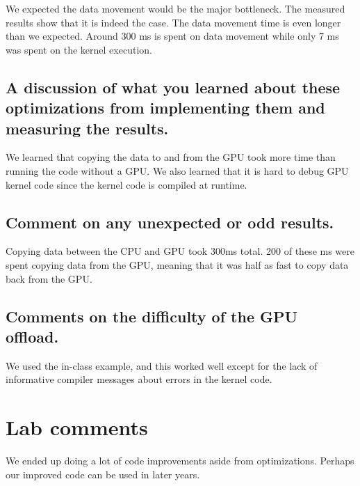\documentclass{article}
\begin{document}
We expected the data movement would be the major bottleneck. The
measured results show that it is indeed the case. The data movement
time is even longer than we expected. Around 300 ms is spent on
data movement while only 7 ms was spent on the kernel execution.

\subsection{A discussion of what you learned about these optimizations from implementing them and measuring the results.}
We learned that copying the data to and from the GPU took more time than running the code without a GPU. We also learned that it is hard to debug GPU kernel code since the kernel code is compiled at runtime.

\subsection{Comment on any unexpected or odd results.}
Copying data between the CPU and GPU took 300ms total. 200 of these ms were spent copying data from the GPU, meaning that it was half as fast to copy data back from the GPU.


\subsection{Comments on the difficulty of the GPU offload.}
We used the in-class example, and this worked well except for the lack of informative compiler messages about errors in the kernel code.

\section{Lab comments}
We ended up doing a lot of code improvements aside from optimizations. Perhaps our improved code can be used in later years.
\end{document}
